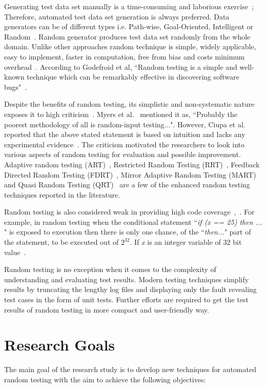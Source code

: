 Generating test data set manually is a time-consuming and laborious exercise~\cite{korel1990}; Therefore, automated test data set generation is always preferred. Data generators can be of different types i.e. Path-wise, Goal-Oriented, Intelligent or Random~\cite{wiki2013}. Random generator produces test data set randomly from the whole domain. Unlike other approaches random technique is simple, widely applicable, easy to implement, faster in computation, free from bias and costs minimum overhead~\cite{Ciupa2007}.  According to Godefroid et al, ``Random testing is a simple and well-known technique which can be remarkably effective in discovering software bugs"~\cite{Godefroid2005}.

Despite the benefits of random testing, its simplistic and non-systematic nature exposes it to high criticism~\cite{white1987}. Myers et al.~\cite{Myers2011} mentioned it as, ``Probably the poorest methodology of all is random-input testing...". However, Ciupa et al. reported that the above stated statement is based on intuition and lacks any experimental evidence~\cite{Ciupa2008a}. The criticism motivated the researchers to look into various aspects of random testing for evaluation and possible improvement. Adaptive random testing (ART)~\cite{Chen2008}, Restricted Random Testing (RRT)~\cite{Chan2002}, Feedback Directed Random Testing (FDRT)~\cite{Pacheco2007a}, Mirror Adaptive Random Testing (MART)~\cite{Chen2003} and Quasi Random Testing (QRT)~\cite{Chen2005} are a few of the enhanced random testing techniques reported in the literature.

Random testing is also considered weak in providing high code coverage~\cite{cohen1997},~\cite{Offutt1996}. For example, in random testing when the conditional statement  ``{\it if (x == 25) then ... }"  is exposed to execution then there is only one chance, of the ``{\it then...}" part of the statement, to be executed out of $2^\text{32}$. If {\it x} is an integer variable of 32 bit value~\cite{Godefroid2005}. 

Random testing is no exception when it comes to the complexity of understanding and evaluating test results. Modern testing techniques simplify results by truncating the lengthy log files and displaying only the fault revealing test cases in the form of unit tests. Further efforts are required to get the test results of random testing in more compact and user-friendly way. 


\section{Research Goals} \label{ResearchGoals}
The main goal of the research study is to develop new techniques for automated random testing with the aim to achieve the following objectives:

